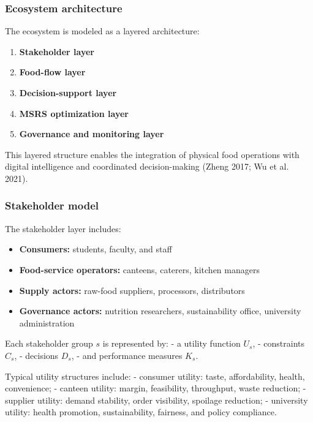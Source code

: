 \documentclass[
  letterpaper,
  DIV=11,
  numbers=noendperiod]{scrartcl}
\providecommand{\tightlist}{%
  \setlength{\itemsep}{0pt}\setlength{\parskip}{0pt}}
\begin{document}
\subsubsection{Ecosystem architecture}\label{ecosystem-architecture}

The ecosystem is modeled as a layered architecture:

\begin{enumerate}
\def\labelenumi{\arabic{enumi}.}
\tightlist
\item
  \textbf{Stakeholder layer}
\item
  \textbf{Food-flow layer}
\item
  \textbf{Decision-support layer}
\item
  \textbf{MSRS optimization layer}
\item
  \textbf{Governance and monitoring layer}
\end{enumerate}

This layered structure enables the integration of physical food
operations with digital intelligence and coordinated decision-making
(Zheng 2017; {Wu et al.} 2021).

\subsubsection{Stakeholder model}\label{stakeholder-model}

The stakeholder layer includes:

\begin{itemize}
\tightlist
\item
  \textbf{Consumers:} students, faculty, and staff
\item
  \textbf{Food-service operators:} canteens, caterers, kitchen managers
\item
  \textbf{Supply actors:} raw-food suppliers, processors, distributors
\item
  \textbf{Governance actors:} nutrition researchers, sustainability
  office, university administration
\end{itemize}

Each stakeholder group \(s\) is represented by: - a utility function
\(U_s\), - constraints \(C_s\), - decisions \(D_s\), - and performance
measures \(K_s\).

Typical utility structures include: - consumer utility: taste,
affordability, health, convenience; - canteen utility: margin,
feasibility, throughput, waste reduction; - supplier utility: demand
stability, order visibility, spoilage reduction; - university utility:
health promotion, sustainability, fairness, and policy compliance.
\end{document}
